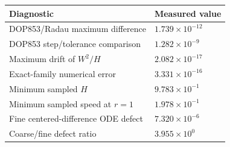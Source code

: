 \begin{center}
\begin{tabular}{ll}
\toprule
Diagnostic & Measured value \\
\midrule
DOP853/Radau maximum difference & $1.739\times10^{-12}$ \\
DOP853 step/tolerance comparison & $1.282\times10^{-9}$ \\
Maximum drift of $W^2/H$ & $2.082\times10^{-17}$ \\
Exact-family numerical error & $3.331\times10^{-16}$ \\
Minimum sampled $H$ & $9.783\times10^{-1}$ \\
Minimum sampled speed at $r=1$ & $1.978\times10^{-1}$ \\
Fine centered-difference ODE defect & $7.320\times10^{-6}$ \\
Coarse/fine defect ratio & $3.955\times10^{0}$ \\
\bottomrule
\end{tabular}
\end{center}
